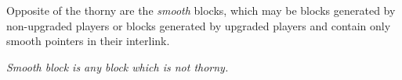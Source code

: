 Opposite of the thorny are the \emph{smooth} blocks, which may be blocks generated by non-upgraded players or blocks generated by upgraded players and contain only smooth pointers in their interlink.

\begin{definition}
	\textit{Smooth block is any block which is not thorny.}
	\label{defn:smooth_block}
\end{definition}